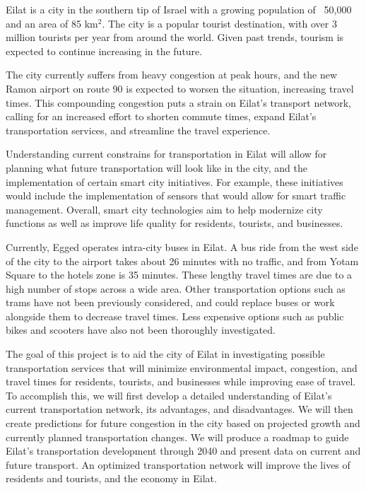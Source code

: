\documentclass[12pt]{article}                         %
\begin{document}
Eilat is a city in the southern tip of Israel with a growing population of ~50,000 and an area of 85 km$^2$. The city is a popular tourist destination, with over 3 million tourists per year from around the world. Given past trends, tourism is expected to continue increasing in the future.

The city currently suffers from heavy congestion at peak hours, and the new Ramon airport on route 90 is expected to worsen the situation, increasing travel times. This compounding congestion puts a strain on Eilat's transport network, calling for an increased effort to shorten commute times, expand Eilat's transportation services, and streamline the travel experience.

Understanding current constrains for transportation in Eilat will allow for planning what future transportation will look like in the city, and the implementation of certain smart city initiatives. For example, these initiatives would include the implementation of sensors that would allow for smart traffic management. Overall, smart city technologies aim to help modernize city functions as well as improve life quality for residents, tourists, and businesses.

Currently, Egged operates intra-city buses in Eilat. A bus ride from the west side of the city to the airport takes about 26 minutes with no traffic, and from Yotam Square to the hotels zone is 35 minutes. These lengthy travel times are due to a high number of stops across a wide area. Other transportation options such as trams have not been previously considered, and could replace buses or work alongside them to decrease travel times. Less expensive options such as public bikes and scooters have also not been thoroughly investigated.

The goal of this project is to aid the city of Eilat in investigating possible transportation services that will minimize environmental impact, congestion, and travel times for residents, tourists, and businesses while improving ease of travel. To accomplish this, we will first develop a detailed understanding of Eilat's current transportation network, its advantages, and disadvantages. We will then create predictions for future congestion in the city based on projected growth and currently planned transportation changes. We will produce a roadmap to guide Eilat's transportation development through 2040 and present data on current and future transport. An optimized transportation network will improve the lives of residents and tourists, and the economy in Eilat.
 
\end{document}
